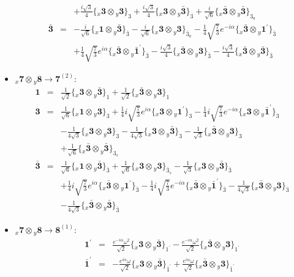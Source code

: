 \documentclass[english]{article}
\newcommand{\rep}[1]{\mathbf{#1}}
\newcommand{\repx}[2]{{}_{#2}\mathbf{#1}}
\newcommand{\subcg}[3]{\big\{ \repx{#1}{x}\otimes\repx{#2}{y}\big\}^{}_{#3}}
\begin{document}
\begin{itemize}
\begin{eqnarray*}
 & & +\frac{i \sqrt{3}}{4}\subcg{3}{3}{3}+\frac{i \sqrt{3}}{4}\subcg{3}{\bar{3}}{3}+\frac{i}{\sqrt{6}}\subcg{\bar{3}}{\bar{3}}{3_{a}}
\\
\rep{\bar{3}} &=& -\frac{i}{\sqrt{6}}\subcg{1}{\bar{3}}{\bar{3}}-\frac{i}{\sqrt{6}}\subcg{3}{3}{\bar{3}_{a}}-\frac{1}{4} \sqrt{\frac{7}{3}} e^{-i \alpha }\subcg{\bar{3}}{1^{\prime}}{\bar{3}} \\ 
 & & +\frac{1}{4} \sqrt{\frac{7}{3}} e^{i \alpha }\subcg{\bar{3}}{\bar{1}^{\prime}}{\bar{3}}-\frac{i \sqrt{3}}{4}\subcg{\bar{3}}{3}{\bar{3}}-\frac{i \sqrt{3}}{4}\subcg{\bar{3}}{\bar{3}}{\bar{3}}
\end{eqnarray*}
\item $\repx{7}{x}\otimes\repx{8}{y}\to\rep{7}^{(2)}$:
\begin{eqnarray*}
\rep{1} &=& \frac{1}{\sqrt{2}}\subcg{3}{\bar{3}}{1}+\frac{1}{\sqrt{2}}\subcg{\bar{3}}{3}{1}
\\
\rep{3} &=& \frac{1}{\sqrt{6}}\subcg{1}{3}{3}+\frac{1}{4} i \sqrt{\frac{7}{3}} e^{i \alpha }\subcg{3}{1^{\prime}}{3}-\frac{1}{4} i \sqrt{\frac{7}{3}} e^{-i \alpha }\subcg{3}{\bar{1}^{\prime}}{3} \\ 
 & & -\frac{1}{4 \sqrt{3}}\subcg{3}{3}{3}-\frac{1}{4 \sqrt{3}}\subcg{3}{\bar{3}}{3}-\frac{1}{\sqrt{3}}\subcg{\bar{3}}{3}{3} \\ 
 & & +\frac{1}{\sqrt{6}}\subcg{\bar{3}}{\bar{3}}{3_{s}}
\\
\rep{\bar{3}} &=& \frac{1}{\sqrt{6}}\subcg{1}{\bar{3}}{\bar{3}}+\frac{1}{\sqrt{6}}\subcg{3}{3}{\bar{3}_{s}}-\frac{1}{\sqrt{3}}\subcg{3}{\bar{3}}{\bar{3}} \\ 
 & & +\frac{1}{4} i \sqrt{\frac{7}{3}} e^{i \alpha }\subcg{\bar{3}}{1^{\prime}}{\bar{3}}-\frac{1}{4} i \sqrt{\frac{7}{3}} e^{-i \alpha }\subcg{\bar{3}}{\bar{1}^{\prime}}{\bar{3}}-\frac{1}{4 \sqrt{3}}\subcg{\bar{3}}{3}{\bar{3}} \\ 
 & & -\frac{1}{4 \sqrt{3}}\subcg{\bar{3}}{\bar{3}}{\bar{3}}
\end{eqnarray*}
\item $\repx{7}{x}\otimes\repx{8}{y}\to\rep{8}^{(1)}$:
\begin{eqnarray*}
\rep{1^{\prime}} &=& \frac{e^{-i \alpha } \omega ^2}{\sqrt{2}}\subcg{3}{\bar{3}}{1^{\prime}}-\frac{e^{-i \alpha } \omega ^2}{\sqrt{2}}\subcg{\bar{3}}{3}{1^{\prime}}
\\
\rep{\bar{1}^{\prime}} &=& -\frac{e^{i \alpha } \omega }{\sqrt{2}}\subcg{3}{\bar{3}}{\bar{1}^{\prime}}+\frac{e^{i \alpha } \omega }{\sqrt{2}}\subcg{\bar{3}}{3}{\bar{1}^{\prime}}
\\

\end{eqnarray*}
\end{itemize}
\end{document}

